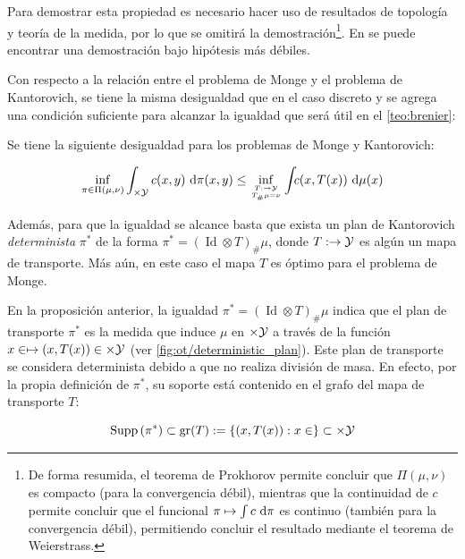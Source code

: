 Para demostrar esta propiedad es necesario hacer uso de resultados de topología y teoría de la medida, por lo que se omitirá la demostración\footnote{De forma resumida, el teorema de Prokhorov permite concluir que $\Pi(\mu,\nu)$ es compacto (para la convergencia débil), mientras que la continuidad de $c$ permite concluir que el funcional $\pi\mapsto \int c\,\operatorname{d}\!\pi$ es continuo (también para la convergencia débil), permitiendo concluir el resultado mediante el teorema de Weierstrass.}. En \cite{villani2003topics} se puede encontrar una demostración bajo hipótesis más débiles.

Con respecto a la relación entre el problema de Monge y el problema de Kantorovich, se tiene la misma desigualdad que en el caso discreto y se agrega una condición suficiente para alcanzar la igualdad que será útil en el \autoref{teo:brenier}:

\begin{prop}
	\label{prop:monge_kantorovich_ineq_continuous}
	Se tiene la siguiente desigualdad para los problemas de Monge y Kantorovich:

	\begin{equation}
		\inf_{\pi \in \Pi(\mu,\nu)} \int_{\xspace\times\yspace} c(x, y) \d\pi(x, y) \leq
		\inf_{\feasible{T:\xspace\to\yspace}{T_\#\mu=\nu}}
		\int_{\xspace} c(x, T(x)) \d\mu(x)
	\end{equation}

	Además, para que la igualdad se alcance basta que exista un plan de Kantorovich \textit{determinista} $\pi^*$ de la forma $\pi^* = (\operatorname{Id}\otimes T)_\#\mu$, donde $T:\to\mathcal{Y}$ es algún un mapa de transporte. Más aún, en este caso el mapa $T$ es óptimo para el problema de Monge.
\end{prop}

En la proposición anterior, la igualdad $\pi^* = (\operatorname{Id}\otimes T)_\#\mu$ indica que el plan de transporte $\pi^*$ es la medida que induce $\mu$ en $\times\mathcal{Y}$ a través de la función $x\in\mapsto (x,T(x))\in\times\mathcal{Y}$ (ver \autoref{fig:ot/deterministic_plan}). Este plan de transporte se considera determinista debido a que no realiza división de masa. En efecto, por la propia definición de $\pi^*$, su soporte está contenido en el grafo del mapa de transporte $T$:

\begin{equation}
	\operatorname{Supp}\left(\pi^*\right)
	\subset \operatorname{gr}(T) := \{(x,T(x)) : x\in\}
	\subset \times\mathcal{Y}
\end{equation}

